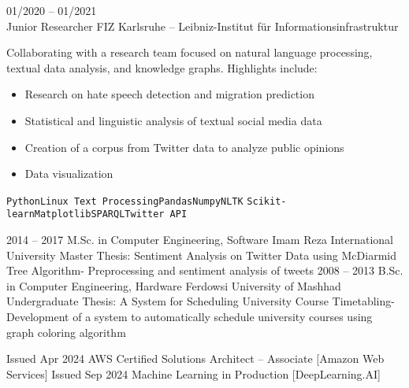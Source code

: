 \documentclass[9pt]{developercv} %
\begin{document}
\begin{entrylist}
{        }
    	\entry
    		{01/2020 -- 01/2021\\}
    		{Junior Researcher}
    		{FIZ Karlsruhe – Leibniz-Institut für Informationsinfrastruktur}
    		{Collaborating with a research team focused on natural language processing, textual data analysis, and knowledge graphs. Highlights include:
            \begin{itemize}
                \item Research on hate speech detection and migration prediction
                \item Statistical and linguistic analysis of textual social media data
                \item Creation of a corpus from Twitter data to analyze public opinions
                \item Data visualization
            \end{itemize}
            \texttt{Python}\slashsep\texttt{Linux Text Processing}\slashsep\texttt{Pandas}\slashsep\texttt{Numpy}\slashsep\texttt{NLTK}\slashsep
            \texttt{Scikit-learn}\slashsep\texttt{Matplotlib}\slashsep\texttt{SPARQL}\slashsep\texttt{Twitter API}
            }
    \end{entrylist}


    \pagebreak
	\begin{entrylist}
		\entry
		{2014 – 2017}
		{M.Sc. in Computer Engineering, Software}
		{Imam Reza International University}
		{Master Thesis: Sentiment Analysis on Twitter Data using McDiarmid Tree Algorithm- Preprocessing and sentiment analysis of tweets}
		\entry
		{2008 – 2013}
		{B.Sc. in Computer Engineering, Hardware}
		{Ferdowsi University of Mashhad}
		{Undergraduate Thesis: A System for Scheduling University Course Timetabling- Development of a system to automatically schedule university courses using graph coloring algorithm}
	\end{entrylist}

	\cvsect{Certifications}
        \begin{entrylist}
            \entry
            {Issued Apr 2024}
            {AWS Certified Solutions Architect – Associate}
            {[Amazon Web Services]}
            \entry
            {Issued Sep 2024}
            {Machine Learning in Production}
            {[DeepLearning.AI]}
        \end{entrylist}
\end{document}
